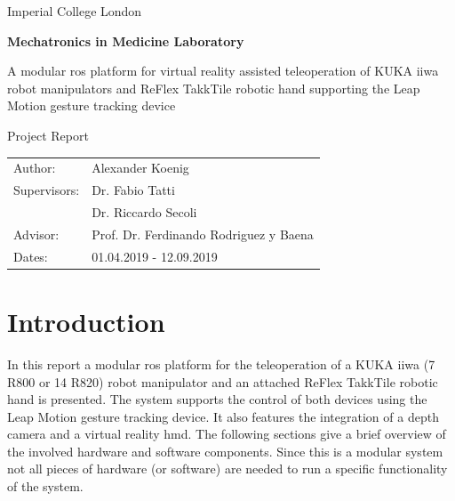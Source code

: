 \documentclass[headsepline,footinclude=false,fontsize=11pt,paper=a4,listof=totoc,bibliography=totoc,BCOR=12mm,DIV=14]{scrbook}
\begin{document}

\begin{titlepage}
	\centering
	\vspace*{10mm}
	\huge Imperial College London
	\vspace{30mm}
	
	\large \textbf{Mechatronics in Medicine Laboratory}
	
	\vspace{10mm}
	A modular \gls{ros} platform for virtual reality assisted teleoperation of KUKA iiwa robot manipulators and ReFlex TakkTile robotic hand supporting the Leap Motion gesture tracking device
	
	\vspace{10mm}
	Project Report
	
	\vspace{70mm}
	\begin{tabular}{l l}
    Author:          & Alexander Koenig \\
    Supervisors:     & Dr. Fabio Tatti \\
    				 & Dr. Riccardo Secoli \\
    Advisor:         & Prof. Dr. Ferdinando Rodriguez y Baena \\
    Dates: 	 		 & 01.04.2019 - 12.09.2019 \\
    \end{tabular}
	
\end{titlepage}

\printglossaries
\listoffigures{}
\listoftables{}

\tableofcontents

\chapter{Introduction}

In this report a modular \gls{ros} platform for the teleoperation of a KUKA iiwa (7 R800 or 14 R820) robot manipulator and an attached ReFlex TakkTile robotic hand is presented. The system supports the control of both devices using the Leap Motion gesture tracking device. It also features the integration of a depth camera and a virtual reality \gls{hmd}. The following sections give a brief overview of the involved hardware and software components. Since this is a modular system not all pieces of hardware (or software) are needed to run a specific functionality of the system.
\end{document}
